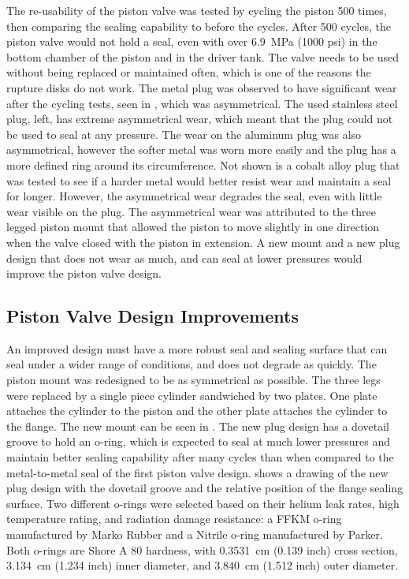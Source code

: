 The re-usability of the piston valve was tested by cycling the piston 500 times, then comparing the sealing capability to before the cycles. After 500 cycles, the piston valve would not hold a seal, even with over \SI{6.9}{\mega\pascal} (1000 psi) in the bottom chamber of the piston and in the driver tank. The valve needs to be used without being replaced or maintained often, which is one of the reasons the rupture disks do not work. The metal plug was observed to have significant wear after the cycling tests, seen in , which was asymmetrical. The used stainless steel plug, left, has extreme asymmetrical wear, which meant that the plug could not be used to seal at any pressure. The wear on the aluminum plug was also asymmetrical, however the softer metal was worn more easily and the plug has a more defined ring around its circumference. Not shown is a cobalt alloy plug that was tested to see if a harder metal would better resist wear and maintain a seal for longer. However, the asymmetrical wear degrades the seal, even with little wear visible on the plug. The asymmetrical wear was attributed to the three legged piston mount that allowed the piston to move slightly in one direction when the valve closed with the piston in extension. A new mount and a new plug design that does not wear as much, and can seal at lower pressures would improve the piston valve design.



\subsection{Piston Valve Design Improvements} \label{ss:new valve}



An improved design must have a more robust seal and sealing surface that can seal under a wider range of conditions, and does not degrade as quickly. The piston mount was redesigned to be as symmetrical as possible. The three legs were replaced by a single piece cylinder sandwiched by two plates. One plate attaches the cylinder to the piston and the other plate attaches the cylinder to the flange. The new mount can be seen in . The new plug design has a dovetail groove to hold an o-ring, which is expected to seal at much lower pressures and maintain better sealing capability after many cycles than when compared to the metal-to-metal seal of the first piston valve design.  shows a drawing of the new plug design with the dovetail groove and the relative position of the flange sealing surface. Two different o-rings were selected based on their helium leak rates, high temperature rating, and radiation damage resistance: a FFKM o-ring manufactured by Marko Rubber and a Nitrile o-ring manufactured by Parker. Both o-rings are Shore A 80 hardness, with \SI{0.3531}{\centi\meter} (0.139 inch) cross section, \SI{3.134}{\centi\meter} (1.234 inch) inner diameter, and \SI{3.840}{\centi\meter} (1.512 inch) outer diameter.


